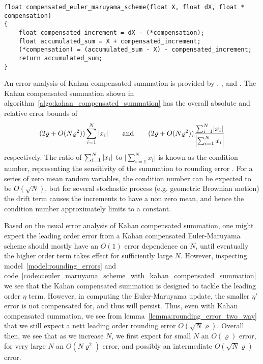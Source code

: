 \documentclass[manuscript,review]{acmart}
\begin{document}
\begin{lstfloat}[htb]
\begin{lstlisting}[style=C, caption={C implementation of the Euler-Maruyama scheme using Kahan compensated summation from  algorithm~\ref{algo:kahan_compensated_summation}.}, label={code:c:euler_maruyama_scheme_with_kahan_compensated_summation}]
float compensated_euler_maruyama_scheme(float X, float dX, float * compensation)
{
    float compensated_increment = dX - (*compensation); 
    float accumulated_sum = X + compensated_increment;
    (*compensation) = (accumulated_sum - X) - compensated_increment;
    return accumulated_sum;
}
\end{lstlisting}
\end{lstfloat}

An error analysis of Kahan compensated summation is provided by \citet[page~791, (3.11)]{higham1993accuracy}, \citet[Excercise~19, pages 229 and 571--573]{knuth2014art}, and \citet{goldberg1991every}. The Kahan compensated summation shown in  algorithm~\ref{algo:kahan_compensated_summation} has the overall absolute and relative error bounds of 
\begin{equation*}
(2\varrho + O(N\varrho^2))\sum_{i=1}^{N} \abs{x_i}
\qquad \text{and} \qquad
(2\varrho + O(N\varrho^2))\dfrac{\sum_{i=1}^{N} \lvert x_i\rvert}{\left\lvert \sum_{i=1}^{N} x_i\right\rvert} 
\end{equation*}
respectively. The ratio of
$ \sum_{i=1}^{N} \abs{x_i} $ to $\lvert \sum_{i=1}^{N} x_i\rvert $
is known as the condition number, representing the sensitivity of the summation to rounding error \citep{higham2002accuracy,trefethen1997numerical}. For a series of zero mean random variables, the condition number can be expected to be $ O(\sqrt{N}) $, but for several stochastic process (e.g. geometric Brownian motion) the drift term causes the increments to have a non zero mean, and hence the condition number approximately limits to a constant. 

Based on the usual error analysis of Kahan compensated summation, one might expect the leading order error from a Kahan compensated Euler-Maruyama scheme should mostly have an $ O(1) $ error dependence on $ N $, until eventually the higher order term takes effect for sufficiently large $ N $. However, inspecting model~\ref{model:rounding_errors} and code~\ref{code:c:euler_maruyama_scheme_with_kahan_compensated_summation} we see that the Kahan compensated summation is designed to tackle the leading order $ \eta $ term. However, in computing the Euler-Maruyama update, the smaller $ \eta' $ error is not compensated for, and thus will persist. Thus, even with Kahan compensated summation, we see from lemma~\ref{lemma:rounding_error_two_way} that we still expect a nett leading order rounding error $ O(\sqrt{N}\varrho) $. Overall then, we see that as we increase $ N $, we first expect for small $ N $ an $ O(\varrho) $ error, for very large $ N $ an $ O(N\varrho^2) $ error, and possibly an intermediate $ O(\sqrt{N}\varrho) $ error. 
\end{document}
